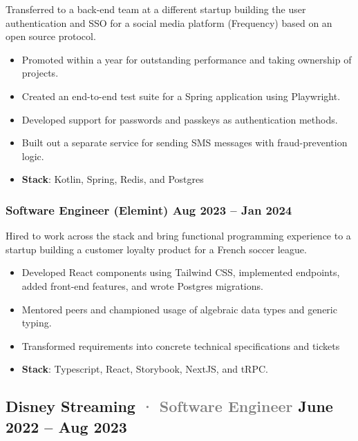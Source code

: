 \documentclass[10pt]{article} %
\providecommand{\tightlist}{%
  \setlength{\itemsep}{0pt}\setlength{\parskip}{0pt}}
\renewcommand{\emph}[1]{%
  \textcolor{gray}{#1}%
}
\begin{document}
\begin{paracol}{2}
Transferred to a back-end team at a different startup building the user
authentication and SSO for a social media platform (Frequency) based on
an open source protocol.

\begin{itemize}
\tightlist
\item
  Promoted within a year for outstanding performance and taking
  ownership of projects.
\item
  Created an end-to-end test suite for a Spring application using
  Playwright.
\item
  Developed support for passwords and passkeys as authentication
  methods.
\item
  Built out a separate service for sending SMS messages with
  fraud-prevention logic.
\item
  \textbf{Stack}: Kotlin, Spring, Redis, and Postgres
\end{itemize}

\hypertarget{software-engineer-elemint-aug-2023-jan-2024}{%
\subsubsection{\texorpdfstring{\small Software Engineer (Elemint)
\hfill \small Aug 2023 -- Jan
2024}{Software Engineer (Elemint) Aug 2023 -- Jan 2024}}\label{software-engineer-elemint-aug-2023-jan-2024}}

Hired to work across the stack and bring functional programming
experience to a startup building a customer loyalty product for a French
soccer league.

\begin{itemize}
\tightlist
\item
  Developed React components using Tailwind CSS, implemented endpoints,
  added front-end features, and wrote Postgres migrations.
\item
  Mentored peers and championed usage of algebraic data types and
  generic typing.
\item
  Transformed requirements into concrete technical specifications and
  tickets
\item
  \textbf{Stack}: Typescript, React, Storybook, NextJS, and tRPC.
\end{itemize}

\hypertarget{disney-streaming-software-engineer-june-2022-aug-2023}{%
\subsection{\texorpdfstring{Disney Streaming \emph{· \small Software
Engineer} \hfill \small June 2022 -- Aug
2023}{Disney Streaming · Software Engineer June 2022 -- Aug 2023}}\label{disney-streaming-software-engineer-june-2022-aug-2023}}


\end{paracol}
\end{document}
